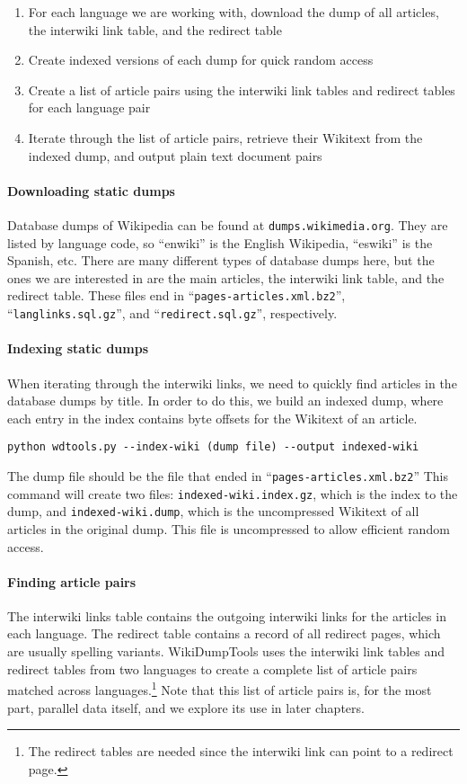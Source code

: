 \begin{enumerate}
\item For each language we are working with, download the dump of all articles,
the interwiki link table, and the redirect table
\item Create indexed versions of each dump for quick random access
\item Create a list of article pairs using the interwiki link tables and
redirect tables for each language pair
\item Iterate through the list of article pairs, retrieve their Wikitext from
the indexed dump, and output plain text document pairs
\end{enumerate}

\paragraph{Downloading static dumps}
Database dumps of Wikipedia can be found at {\tt dumps.wikimedia.org}. They are
listed by language code, so ``enwiki'' is the English Wikipedia, ``eswiki'' is
the Spanish, etc. There are many different types of database dumps here, but the
ones we are interested in are the main articles, the interwiki link table, and
the redirect table. These files end in ``{\tt pages-articles.xml.bz2}'',
``{\tt langlinks.sql.gz}'', and ``{\tt redirect.sql.gz}'', respectively.

\paragraph{Indexing static dumps}
When iterating through the interwiki links, we need to quickly find articles in
the database dumps by title. In order to do this, we build an indexed dump,
where each entry in the index contains byte offsets for the Wikitext of an
article.

\begin{verbatim}
python wdtools.py --index-wiki (dump file) --output indexed-wiki
\end{verbatim}

The dump file should be the file that ended in ``{\tt pages-articles.xml.bz2}''
This command will create two files: {\tt indexed-wiki.index.gz}, which is the
index to the dump, and {\tt indexed-wiki.dump}, which is the uncompressed
Wikitext of all articles in the original dump. This file is uncompressed to
allow efficient random access.

\paragraph{Finding article pairs}
The interwiki links table contains the outgoing interwiki links for the articles
in each language. The redirect table contains a record of all redirect pages,
which are usually spelling variants. WikiDumpTools uses the interwiki link
tables and redirect tables from two languages to create a complete list of
article pairs matched across languages.\footnote{The redirect tables are needed
since the interwiki link can point to a redirect page.} Note that this list of
article pairs is, for the most part, parallel data itself, and we explore its use in
later chapters.

